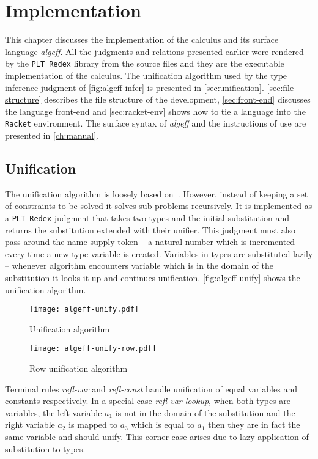 \documentclass[inz, english, longabstract]{iithesis}
\newcommand{\Redex}{\texttt{PLT Redex}}
\newcommand{\Racket}{\texttt{Racket}}
\begin{document}
\chapter{Implementation}\label{ch:implementation}
This chapter discusses the implementation of the calculus and its surface language \emph{algeff}.
All the judgments and relations presented earlier were rendered by the \Redex{} library from the source files and they are the executable implementation of the calculus.
The unification algorithm used by the type inference judgment of \autoref{fig:algeff-infer} is presented in \autoref{sec:unification}.
\autoref{sec:file-structure} describes the file structure of the development, \autoref{sec:front-end} discusses the language front-end and \autoref{sec:racket-env} shows how to tie a language into the \Racket{} environment.
The surface syntax of \emph{algeff} and the instructions of use are presented in \autoref{ch:manual}.

\section{Unification}\label{sec:unification}
The unification algorithm is loosely based on~\cite{Pierce2002}.
However, instead of keeping a set of constraints to be solved it solves sub-problems recursively.
It is implemented as a \Redex{} judgment that takes two types and the initial substitution and returns the substitution extended with their unifier.
This judgment must also pass around the name supply token -- a natural number which is incremented every time a new type variable is created.
Variables in types are substituted lazily -- whenever algorithm encounters variable which is in the domain of the substitution it looks it up and continues unification.
\autoref{fig:algeff-unify} shows the unification algorithm.

\begin{figure}
  \centering
  \texttt{[image: algeff-unify.pdf]}
  \caption{Unification algorithm}
  \label{fig:algeff-unify}
\end{figure}

\begin{figure}
  \centering
  \texttt{[image: algeff-unify-row.pdf]}
  \caption{Row unification algorithm}
  \label{fig:algeff-unify-row}
\end{figure}

Terminal rules \emph{refl-var} and \emph{refl-const} handle unification of equal variables and constants respectively.
In a special case \emph{refl-var-lookup}, when both types are variables, the left variable $a_1$ is not in the domain of the substitution and the right variable $a_2$ is mapped to $a_3$ which is equal to $a_1$ then they are in fact the same variable and should unify.
This corner-case arises due to lazy application of substitution to types.
\end{document}
